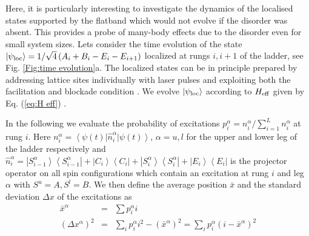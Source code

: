 \documentclass[prl,aps,twocolumn,showpacs,superscriptaddress,longbibliography]{revtex4-1}
\newcommand{\lan}{\left\langle}
\newcommand{\ran}{\right\rangle}
\newcommand{\ket}[1]{\left| #1 \ran}
\newcommand{\bra}[1]{\lan #1 \right|}
\begin{document}
Here, it is particularly interesting to investigate the dynamics of the localised states supported by the flatband which would not evolve if the disorder was absent. This provides a probe of many-body effects due to the disorder even for small system sizes. Lets consider the time evolution of the state $\ket{\psi_{\rm loc}} = 1/\sqrt{4} \left( A_i + B_i - E_i - E_{i+1} \right)$ localized at rungs $i,i+1$ of the ladder, see Fig. \ref{Fig:time evolution}a. The localized states can be in principle prepared by addressing lattice sites individually with laser pulses and exploiting both the facilitation and blockade condition \cite{SM}. We evolve $\ket{\psi_{\rm loc}}$ according to $H_{\rm eff}$ given by Eq. (\ref{eq:H eff}) \cite{SM}.


In the following we evaluate the probability of excitations $p^\alpha_i = n^\alpha_i/\sum_{i=1}^{L} n^\alpha_i$ at rung $i$. Here $n^\alpha_i = \bra{\psi(t)} \hat{n}^\alpha_i \ket{\psi(t)}$, $\alpha=u,l$ for the upper and lower leg of the ladder respectively and $\hat{n}^\alpha_i = \ket{S^\alpha_{i-1}}\bra{S^\alpha_{i-1}} + \ket{C_{i}}\bra{C_{i}} + \ket{S^\alpha_{i}}\bra{S^\alpha_{i}} + \ket{E_{i}}\bra{E_{i}}$ is the projector operator on all spin configurations which contain an excitation at rung $i$ and leg $\alpha$ with $S^u=A, S^l=B$.
We then define the average position $\bar{x}$ and the standard deviation $\Delta x$ of the excitations as
\begin{eqnarray}
	\bar{x}^\alpha &=& \sum p^\alpha_i i \\
	\left( \Delta x^\alpha \right)^2 &=& \sum_i p^\alpha_i i^2 - \left(\bar{x}^\alpha \right)^2 = \sum_i p^\alpha_i (i-\bar{x}^\alpha)^2
	\label{eq:Delta x}
\end{eqnarray}
\end{document}
